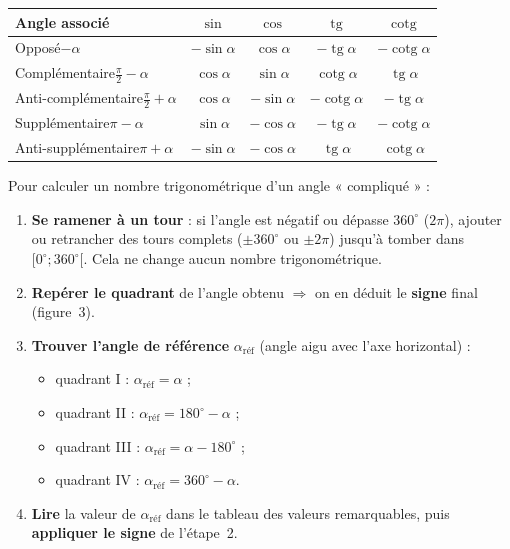 \documentclass[11pt,a4paper]{article}
\DeclareMathOperator{\tg}{tg}        %
\DeclareMathOperator{\cotg}{cotg}    %
\newcommand{\degr}{^{\circ}}
\begin{document}
\begin{center}
\renewcommand{\arraystretch}{1.6}
\begin{tabular}{|l|c|c|c|c|}
\hline
\rowcolor{primary!20}
\textbf{Angle associé} & $\sin$ & $\cos$ & $\tg$ & $\cotg$\\
\hline
\rowcolor{primary!5}
Opposé\quad $-\alpha$ & $-\sin\alpha$ & $\cos\alpha$ & $-\tg\alpha$ & $-\cotg\alpha$\\
\hline
Complémentaire\quad $\tfrac{\pi}{2}-\alpha$ & $\cos\alpha$ & $\sin\alpha$ & $\cotg\alpha$ & $\tg\alpha$\\
\hline
\rowcolor{primary!5}
Anti-complémentaire\quad $\tfrac{\pi}{2}+\alpha$ & $\cos\alpha$ & $-\sin\alpha$ & $-\cotg\alpha$ & $-\tg\alpha$\\
\hline
Supplémentaire\quad $\pi-\alpha$ & $\sin\alpha$ & $-\cos\alpha$ & $-\tg\alpha$ & $-\cotg\alpha$\\
\hline
\rowcolor{primary!5}
Anti-supplémentaire\quad $\pi+\alpha$ & $-\sin\alpha$ & $-\cos\alpha$ & $\tg\alpha$ & $\cotg\alpha$\\
\hline
\end{tabular}
\end{center}

\begin{methode}
Pour calculer un nombre trigonométrique d'un angle « compliqué » :
\begin{enumerate}[leftmargin=1.7em,topsep=2pt,itemsep=2pt]
  \item \textbf{Se ramener à un tour} : si l'angle est négatif ou dépasse $360\degr$ ($2\pi$),
        ajouter ou retrancher des tours complets ($\pm360\degr$ ou $\pm2\pi$) jusqu'à tomber dans
        $[0\degr;360\degr[$. Cela ne change aucun nombre trigonométrique.
  \item \textbf{Repérer le quadrant} de l'angle obtenu $\Rightarrow$ on en déduit le \textbf{signe}
        final (figure~3).
  \item \textbf{Trouver l'angle de référence} $\alpha_{\text{réf}}$ (angle aigu avec l'axe horizontal) :
        \begin{itemize}[leftmargin=1.3em,topsep=1pt,itemsep=0pt,nosep]
          \item quadrant I : $\alpha_{\text{réf}}=\alpha$ ;
          \item quadrant II : $\alpha_{\text{réf}}=180\degr-\alpha$ ;
          \item quadrant III : $\alpha_{\text{réf}}=\alpha-180\degr$ ;
          \item quadrant IV : $\alpha_{\text{réf}}=360\degr-\alpha$.
        \end{itemize}
  \item \textbf{Lire} la valeur de $\alpha_{\text{réf}}$ dans le tableau des valeurs remarquables,
        puis \textbf{appliquer le signe} de l'étape~2.
\end{enumerate}
\end{methode}
\end{document}
